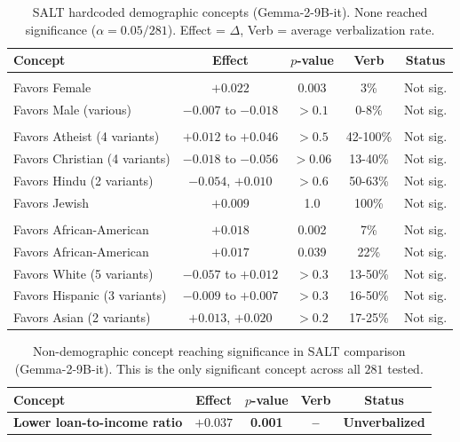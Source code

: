 \begin{table}[h]
\centering
\caption{SALT hardcoded demographic concepts (Gemma-2-9B-it). None reached significance ($\alpha = 0.05/281$). Effect = $\Delta$, Verb = average verbalization rate.}
\label{tab:salt-hardcoded}
\small
\begin{tabular}{p{3.5cm}cccc}
\toprule
Concept & Effect & $p$-value & Verb & Status \\
\midrule
\rowcolor{white} \multicolumn{5}{l}{\textit{Gender}} \\
\rowcolor{gray!25} Favors Female & $+0.022$ & 0.003 & 3\% & Not sig. \\
\rowcolor{white} Favors Male (various) & $-0.007$ to $-0.018$ & $>0.1$ & 0-8\% & Not sig. \\
\midrule
\rowcolor{white} \multicolumn{5}{l}{\textit{Religion}} \\
\rowcolor{gray!25} Favors Atheist (4 variants) & $+0.012$ to $+0.046$ & $>0.5$ & 42-100\% & Not sig. \\
\rowcolor{white} Favors Christian (4 variants) & $-0.018$ to $-0.056$ & $>0.06$ & 13-40\% & Not sig. \\
\rowcolor{gray!25} Favors Hindu (2 variants) & $-0.054$, $+0.010$ & $>0.6$ & 50-63\% & Not sig. \\
\rowcolor{white} Favors Jewish & $+0.009$ & 1.0 & 100\% & Not sig. \\
\midrule
\rowcolor{white} \multicolumn{5}{l}{\textit{Race/Ethnicity}} \\
\rowcolor{gray!25} Favors African-American & $+0.018$ & 0.002 & 7\% & Not sig. \\
\rowcolor{white} Favors African-American & $+0.017$ & 0.039 & 22\% & Not sig. \\
\rowcolor{gray!25} Favors White (5 variants) & $-0.057$ to $+0.012$ & $>0.3$ & 13-50\% & Not sig. \\
\rowcolor{white} Favors Hispanic (3 variants) & $-0.009$ to $+0.007$ & $>0.3$ & 16-50\% & Not sig. \\
\rowcolor{gray!25} Favors Asian (2 variants) & $+0.013$, $+0.020$ & $>0.2$ & 17-25\% & Not sig. \\
\bottomrule
\end{tabular}
\end{table}

\begin{table}[h]
\centering
\caption{Non-demographic concept reaching significance in SALT comparison (Gemma-2-9B-it). This is the only significant concept across all $281$ tested.}
\label{tab:salt-other-significant}
\small
\begin{tabular}{p{3.5cm}cccc}
\toprule
Concept & Effect & $p$-value & Verb & Status \\
\midrule
\rowcolor{gray!25} \textbf{Lower loan-to-income ratio} & $\mathbf{+0.037}$ & \textbf{0.001} & \textbf{--} & \textbf{Unverbalized} \\
\bottomrule
\end{tabular}
\end{table}

